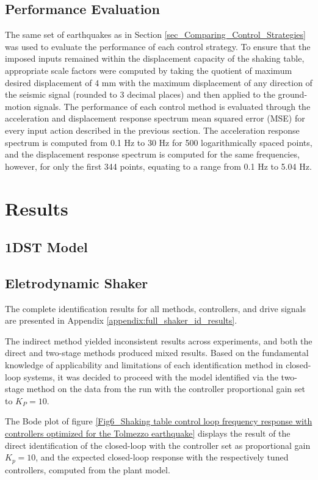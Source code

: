 \documentclass[conference]{IEEEtran}
\begin{document}
\subsection{Performance Evaluation}

The same set of earthquakes as in Section \ref{sec_Comparing_Control_Strategies} was used to evaluate the performance of each control strategy. To ensure that the imposed inputs remained within the displacement capacity of the shaking table, appropriate scale factors were computed by taking the quotient of maximum desired displacement of 4 mm with the maximum displacement of any direction of the seismic signal (rounded to 3 decimal places) and then applied to the ground-motion signals. 
The performance of each control method is evaluated through the acceleration and displacement response spectrum mean squared error (MSE) for every input action described in the previous section. The acceleration response spectrum is computed from 0.1 Hz to 30 Hz for 500 logarithmically spaced points, and the displacement response spectrum is computed for the same frequencies, however, for only the first 344 points, equating to a range from 0.1 Hz to 5.04 Hz.

\section{Results}

\subsection{1DST Model}


\subsection{Eletrodynamic Shaker}

The complete identification results for all methods, controllers, and drive signals are presented in Appendix \ref{appendix:full_shaker_id_results}. 

The indirect method yielded inconsistent results across experiments, and both the direct and two-stage methods produced mixed results. Based on the fundamental knowledge of applicability and limitations of each identification method in closed-loop systems, it was decided to proceed with the model identified via the two-stage method on the data from the run with the controller proportional gain set to $K_P = 10 $.

The Bode plot of figure \ref{Fig6_Shaking table control loop frequency response with controllers optimized for the Tolmezzo earthquake} displays the result of the direct identification of the closed-loop with the controller set as proportional gain $K_p = 10$, and the expected closed-loop response with the respectively tuned controllers, computed from the plant model.
\end{document}

